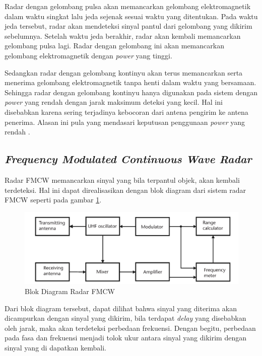 Radar dengan gelombang pulsa akan memancarkan gelombang elektromagnetik dalam waktu singkat lalu jeda sejenak sesuai waktu yang ditentukan. Pada waktu jeda tersebut, radar akan mendeteksi sinyal pantul dari gelombang yang dikirim sebelumnya. Setelah waktu jeda berakhir, radar akan kembali memancarkan gelombang pulsa lagi. Radar dengan gelombang ini akan memancarkan gelombang elektromagnetik dengan \textit{power} yang tinggi. 

Sedangkan radar dengan gelombang kontinyu akan terus memancarkan serta menerima gelombang elektromagnetik tanpa henti dalam waktu yang bersamaan. Sehingga radar dengan gelombang kontinyu hanya digunakan pada sistem dengan \textit{power} yang rendah dengan jarak maksimum deteksi yang kecil. Hal ini disebabkan karena sering terjadinya kebocoran dari antena pengirim ke antena penerima. Alasan ini pula yang mendasari keputusan penggunaan \textit{power} yang rendah \cite{Scheer2015}.

\subsection{\textit{Frequency Modulated Continuous Wave Radar}}

Radar FMCW memancarkan sinyal yang bila terpantul objek, akan kembali terdeteksi. Hal ini dapat direalisasikan dengan blok diagram dari sistem radar FMCW seperti pada gambar \ref{pic:FMCWBlock}.  

\begin{figure}
	\begin{center}
		\includegraphics[scale=0.3]{pics/bab2/blokDiagramFMCW.png}
		\caption[Blok Diagram Radar FMCW]{Blok Diagram Radar FMCW}
		\label{pic:FMCWBlock}
	\end{center}
\end{figure}

Dari blok diagram tersebut, dapat dilihat bahwa sinyal yang diterima akan dicampurkan dengan sinyal yang dikirim, bila terdapat \textit{delay} yang disebabkan oleh jarak, maka akan terdeteksi perbedaan frekuensi. Dengan begitu, perbedaan pada fasa dan frekuensi menjadi tolok ukur antara sinyal yang dikirim dengan sinyal yang di dapatkan kembali.

